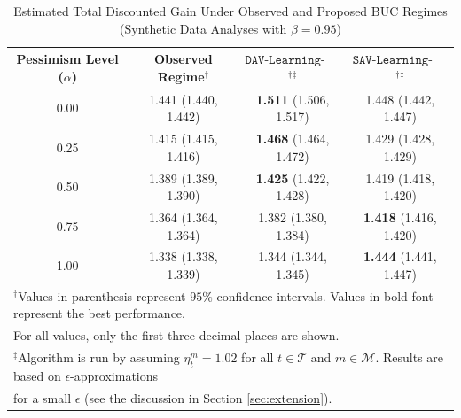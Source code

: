 \documentclass[opre,nonblindrev]{informs2}%
\newcommand{\1}{\hbox{\rm 1\kern-.35em 1}}
\newcommand{\MT}{\mathscr T}
\newcommand{\MM}{\mathscr M}
\newcommand{\SAVBUC}{\texttt{SAV-Learning-BUC}}
\newcommand{\DAVBUC}{\texttt{DAV-Learning-BUC}}
\begin{document}
{
	\renewcommand{\arraystretch}{1.2}
	\begin{table}[t]
		\caption{\baselineskip=10pt  Estimated Total Discounted Gain Under Observed and Proposed BUC Regimes  (Synthetic Data Analyses with $\beta=0.95$)}\label{Table:Results2BUC}

		\begin{center}
			\scriptsize
			\begin{tabular}{cccc}
				\hline
				{\bf Pessimism Level ($\alpha$)} & {\bf Observed Regime$^\dag$} & {\bf $\DAVBUC$$^\dag$$^\ddag$} & {\bf $\SAVBUC$$^\dag$$^\ddag$} \\ \hline
				0.00 &  1.441 (1.440, 1.442)  & {\bf 1.511} (1.506, 1.517)  & { 1.448} (1.442, 1.447) \\
                0.25 &  1.415 (1.415, 1.416)  & {\bf 1.468} (1.464, 1.472)  & { 1.429} (1.428, 1.429) \\
                0.50 &  1.389 (1.389, 1.390)  & {\bf 1.425} (1.422, 1.428)  & { 1.419} (1.418, 1.420) \\
                0.75 &  1.364 (1.364, 1.364)  &  1.382 (1.380, 1.384)       & {\bf 1.418} (1.416, 1.420) \\
				1.00 &  1.338 (1.338, 1.339)  &  1.344 (1.344, 1.345)       & {\bf 1.444} (1.441, 1.447) \\
\hline
\multicolumn{4}{l}{$^\dag$\normalfont Values in parenthesis represent $95\%$ confidence intervals. Values in bold font represent the best performance.}\\
\multicolumn{4}{l}{\normalfont For all values, only the first three decimal places are shown.}\\
\multicolumn{4}{l}{$^\ddag$\normalfont Algorithm is run by assuming $\eta_t^m=1.02$ for all $t\in\MT$ and $m\in\MM$. Results are based on $\epsilon$-approximations}\\
 \multicolumn{4}{l}{for a small $\epsilon$ (see the discussion in Section \ref{sec:extension}). }
			\end{tabular}
		
		\end{center}
		\vspace{-10pt}
	\end{table}
}
\end{document}
